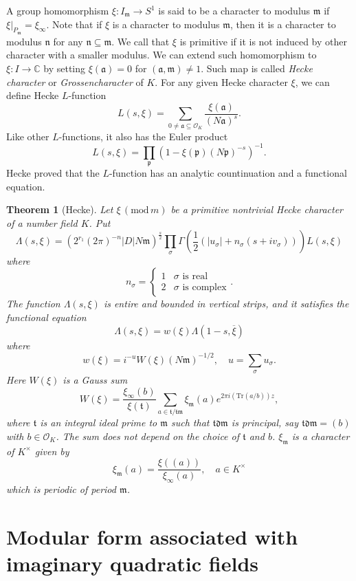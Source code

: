 \documentclass{article}
\newtheorem{theorem}{Theorem}
\newcommand{\Mod}[1]{\,(\mathrm{mod}\,#1)}
\begin{document}
A group homomorphism $\xi:I_{\mathfrak{m}} \to S^{1}$ is said to be a character to modulus $\mathfrak{m}$ if $\xi|_{P_{\mathfrak{m}}} = \xi_{\infty}$. 
Note that if $\xi$ is a character to modulus $\mathfrak{m}$, then it is a character to modulus $\mathfrak{n}$ for any $\mathfrak{n}\subseteq \mathfrak{m}$. 
We call that $\xi$ is primitive if it is not induced by other character with a smaller modulus. 
We can extend such homomorphism to $\xi:I\to \mathbb{C}$ by setting $\xi(\mathfrak{a}) = 0$ for $(\mathfrak{a}, \mathfrak{m}) \neq 1$. 
Such map is called \emph{Hecke character} or \emph{Grossencharacter} of $K$. For any given Hecke character $\xi$, we can define Hecke $L$-function 
$$
L(s, \xi) = \sum_{0\neq \mathfrak{a}\subseteq \mathcal{O}_{K}} \frac{\xi(\mathfrak{a})}{(N\mathfrak{a})^{s}}.
$$
Like other $L$-functions, it also has the Euler product 
$$
L(s, \xi) = \prod_{\mathfrak{p}} (1-\xi(\mathfrak{p})(N\mathfrak{p})^{-s})^{-1}.
$$
Hecke proved that the $L$-function has an analytic countinuation and a functional equation. 
\begin{theorem}[Hecke]
Let $\xi\Mod{m}$ be a primitive nontrivial Hecke character of a number field $K$. Put
$$
\Lambda(s, \xi) = (2^{r_{1}}(2\pi)^{-n}|D|N\mathfrak{m})^{\frac{s}{2}} \prod_{\sigma}\Gamma\left( \frac{1}{2}(|u_{\sigma}| + n_{\sigma}(s+ iv_{\sigma}))\right) L(s, \xi)
$$
where
$$
n_{\sigma} = \begin{cases} 1 & \sigma\text{ is real} \\  2 & \sigma\text{ is complex} \end{cases}. 
$$
The function $\Lambda(s, \xi)$ is entire and bounded in vertical strips, and it satisfies the functional equation 
$$
\Lambda(s, \xi) = w(\xi)\Lambda(1-s, \overline{\xi})
$$
where $$w(\xi) = i^{-u} W(\xi)(N\mathfrak{m})^{-1/2}, \quad u = \sum_{\sigma}u_{\sigma}.$$
Here $W(\xi)$ is a Gauss sum 
$$
W(\xi) = \frac{\xi_{\infty}(b)}{\xi(\mathfrak{t})} \sum_{a\in \mathfrak{t}/\mathfrak{tm}} \xi_{\mathfrak{m}}(a)e^{2\pi i (\mathrm{Tr}(a/b))z}, 
$$
where $\mathfrak{t}$ is an integral ideal prime to $\mathfrak{m}$ such that $\mathfrak{tdm}$ is principal, say $\mathfrak{tdm} = (b)$ with $b\in \mathcal{O}_{K}$. The sum does not depend on the choice of $\mathfrak{t}$ and $b$. $\xi_{\mathfrak{m}}$ is a character of $K^{\times}$ given by 
$$
\xi_{\mathfrak{m}}(a) = \frac{\xi((a))}{\xi_{\infty}(a)}, \quad a\in K^{\times}
$$
which is periodic of period $\mathfrak{m}$. 
\end{theorem}
\section{Modular form associated with  imaginary quadratic fields}
\end{document}
